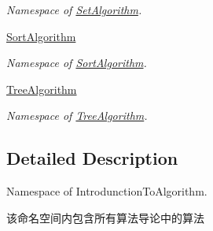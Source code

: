 \begin{DoxyCompactItemize}
\begin{DoxyCompactList}\small\item\em Namespace of \hyperlink{namespace_introduction_to_algorithm_1_1_set_algorithm}{Set\+Algorithm}. \end{DoxyCompactList}\item 
 \hyperlink{namespace_introduction_to_algorithm_1_1_sort_algorithm}{Sort\+Algorithm}
\begin{DoxyCompactList}\small\item\em Namespace of \hyperlink{namespace_introduction_to_algorithm_1_1_sort_algorithm}{Sort\+Algorithm}. \end{DoxyCompactList}\item 
 \hyperlink{namespace_introduction_to_algorithm_1_1_tree_algorithm}{Tree\+Algorithm}
\begin{DoxyCompactList}\small\item\em Namespace of \hyperlink{namespace_introduction_to_algorithm_1_1_tree_algorithm}{Tree\+Algorithm}. \end{DoxyCompactList}\end{DoxyCompactItemize}


\subsection{Detailed Description}
Namespace of Introdunction\+To\+Algorithm. 

该命名空间内包含所有算法导论中的算法 